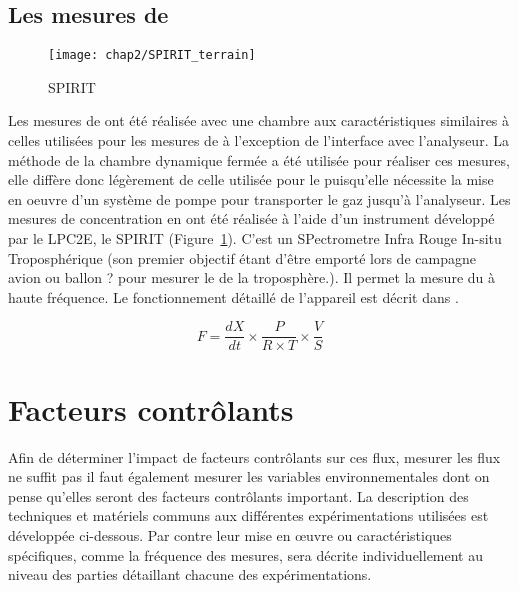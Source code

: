 \subsection{Les mesures de \chh}

\begin{figure}
\texttt{[image: chap2/SPIRIT\_terrain]}
\caption{SPIRIT}
\label{fig:SPIRIT}
\end{figure}

Les mesures de \chh ont été réalisée avec une chambre aux caractéristiques similaires à celles utilisées pour les mesures de \coo à l'exception de l'interface avec l'analyseur.
La méthode de la chambre dynamique fermée a été utilisée pour réaliser ces mesures, elle diffère donc légèrement de celle utilisée pour le \coo puisqu'elle nécessite la mise en oeuvre d'un système de pompe pour transporter le gaz jusqu'à l'analyseur.
Les mesures de concentration en \chh ont été réalisée à l'aide d'un instrument développé par le LPC2E, le SPIRIT (Figure~\ref{fig:SPIRIT}).
C'est un SPectrometre Infra Rouge In-situ Troposphérique (son premier objectif étant d'être emporté lors de campagne avion ou ballon ? pour mesurer le \chh de la troposphère.).
Il permet la mesure du \chh à haute fréquence.
Le fonctionnement détaillé de l'appareil est décrit dans \cite{guimbaud2011}.

\begin{equation}
F = \frac{dX}{dt} \times \frac{P}{R \times T} \times \frac{V}{S}
\end{equation}

%
%


\section{Facteurs contrôlants}
Afin de déterminer l'impact de facteurs contrôlants sur ces flux, mesurer les flux ne suffit pas il faut également mesurer les variables environnementales dont on pense qu'elles seront des facteurs contrôlants important.
La description des techniques et matériels communs aux différentes expérimentations utilisées est développée ci-dessous.
Par contre leur mise en œuvre ou caractéristiques spécifiques, comme la fréquence des mesures, sera décrite individuellement au niveau des parties détaillant chacune des expérimentations.

